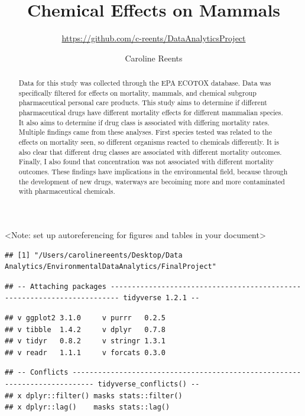 \documentclass[12pt,]{article}
\title{Chemical Effects on Mammals}
\subtitle{\url{https://github.com/c-reents/DataAnalyticsProject}}
\author{Caroline Reents}
\date{}
\begin{document}
\maketitle
\begin{abstract}
Data for this study was collected through the EPA ECOTOX database. Data
was specifically filtered for effects on mortality, mammals, and
chemical subgroup pharmaceutical personal care products. This study aims
to determine if different pharmaceutical drugs have different mortality
effects for different mammalian species. It also aims to determine if
drug class is associated with differing mortality rates. Multiple
findings came from these analyses. First species tested was related to
the effects on mortality seen, so different organisms reacted to
chemicals differently. It is also clear that different drug classes are
associated with different mortality outcomes. Finally, I also found that
concentration was not associated with different mortality outcomes.
These findings have implications in the environmental field, because
through the development of new drugs, waterways are becoiming more and
more contaminated with pharmaceutical chemicals.
\end{abstract}

\newpage

\tableofcontents  \newpage
\listoftables  \newpage
\listoffigures  \newpage

\textless{}Note: set up autoreferencing for figures and tables in your
document\textgreater{}

\begin{verbatim}
## [1] "/Users/carolinereents/Desktop/Data Analytics/EnvironmentalDataAnalytics/FinalProject"
\end{verbatim}

\begin{verbatim}
## -- Attaching packages ------------------------------------------------------------------------ tidyverse 1.2.1 --
\end{verbatim}

\begin{verbatim}
## v ggplot2 3.1.0     v purrr   0.2.5
## v tibble  1.4.2     v dplyr   0.7.8
## v tidyr   0.8.2     v stringr 1.3.1
## v readr   1.1.1     v forcats 0.3.0
\end{verbatim}

\begin{verbatim}
## -- Conflicts --------------------------------------------------------------------------- tidyverse_conflicts() --
## x dplyr::filter() masks stats::filter()
## x dplyr::lag()    masks stats::lag()
\end{verbatim}
\end{document}
